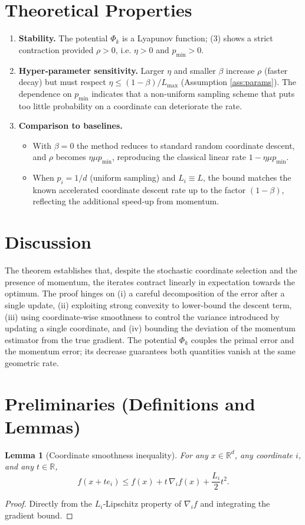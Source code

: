 \documentclass{article}
\newtheorem{lemma}{Lemma}
\newcommand{\R}{\mathbb{R}}
\begin{document}
\section*{Theoretical Properties}
\begin{enumerate}[label=\arabic*.]
\item \textbf{Stability.} The potential $\Phi_k$ is a Lyapunov function; (3) shows a strict contraction provided $\rho>0$, i.e. $\eta>0$ and $p_{\min}>0$.
\item \textbf{Hyper‑parameter sensitivity.} Larger $\eta$ and smaller $\beta$ increase $\rho$ (faster decay) but must respect $\eta\le(1-\beta)/L_{\max}$ (Assumption \ref{ass:params}). The dependence on $p_{\min}$ indicates that a non‑uniform sampling scheme that puts too little probability on a coordinate can deteriorate the rate.
\item \textbf{Comparison to baselines.}
\begin{itemize}
\item With $\beta=0$ the method reduces to standard random coordinate descent, and $\rho$ becomes $\eta\mu p_{\min}$, reproducing the classical linear rate $1-\eta\mu p_{\min}$.
\item When $p_i=1/d$ (uniform sampling) and $L_i\equiv L$, the bound matches the known accelerated coordinate descent rate up to the factor $(1-\beta)$, reflecting the additional speed‑up from momentum.
\end{itemize}
\end{enumerate}

\section*{Discussion}
The theorem establishes that, despite the stochastic coordinate selection and the presence of momentum, the iterates contract linearly in expectation towards the optimum. The proof hinges on (i) a careful decomposition of the error after a single update, (ii) exploiting strong convexity to lower‑bound the descent term, (iii) using coordinate‑wise smoothness to control the variance introduced by updating a single coordinate, and (iv) bounding the deviation of the momentum estimator from the true gradient. The potential $\Phi_k$ couples the primal error and the momentum error; its decrease guarantees both quantities vanish at the same geometric rate.

\newpage
\section*{Preliminaries (Definitions and Lemmas)}
\begin{lemma}[Coordinate smoothness inequality]\label{lem:smooth}
For any $x\in\R^{d}$, any coordinate $i$, and any $t\in\R$,
\[
f(x+te_i)\le f(x)+t\,\nabla_i f(x)+\frac{L_i}{2}t^{2}.
\]
\end{lemma}
\begin{proof}
Directly from the $L_i$‑Lipschitz property of $\nabla_i f$ and integrating the gradient bound.
\end{proof}
\end{document}
